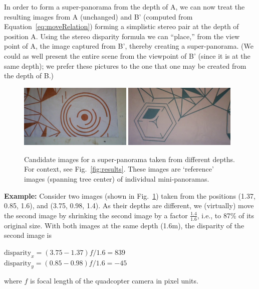 In order to form a super-panorama from the depth of A, we can now
treat the resulting images from A (unchanged) and B’ (computed from
Equation~\ref{eq:moveRelation}) forming a simplistic stereo pair at
the depth of position A.  Using the stereo disparity formula we can
``place,'' from the view point of A, the image captured from B',
thereby creating a super-panorama. (We could as well present the
entire scene from the viewpoint of B' (since it is at the same depth);
we prefer these pictures to the one that one may be created from the
depth of B.)


\begin{figure}[h]
\includegraphics[width=0.48\textwidth]{images/left}
\includegraphics[width=0.48\textwidth]{images/right}
\caption[Example of super-panorama]{Candidate images for a super-panorama taken
from different depths. For context, see Fig.~\ref{fig:results}.  These images are
  `reference' images (spanning  tree center) of individual  mini-panoramas.}
\label{fig:exmaple}
\end{figure}

\textbf{Example:} Consider two images (shown in Fig.~\ref{fig:exmaple}) taken from the positions
(1.37, 0.85, 1.6), and (3.75, 0.98, 1.4).  As their depths are
different, we (virtually) move the second image by shrinking the
second image by a factor $\frac{1.4}{1.6}$, i.e., to 87\% of its
original size. With both images at the same depth (1.6m), the 
disparity of the second image is 
\begin{center}
$\text{disparity}_x = (3.75 - 1.37)f/1.6 = 839$\\
$\text{disparity}_y = (0.85 - 0.98)f/1.6 = -45$
\end{center}
where $f$ is focal length of the quadcopter camera in pixel units.

